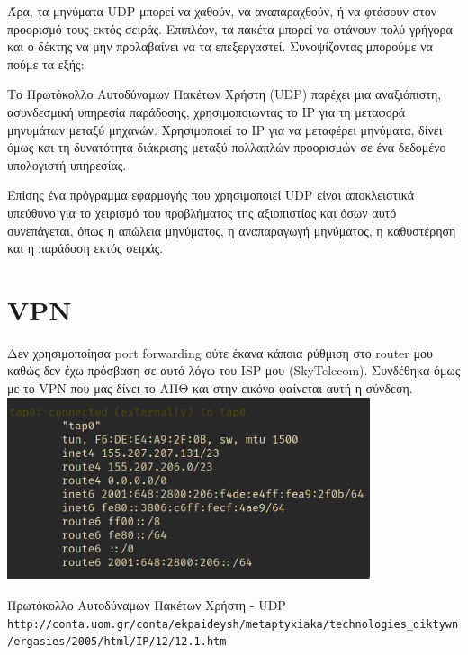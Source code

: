\documentclass{article}
\begin{document}
Άρα, τα μηνύματα UDP μπορεί να χαθούν, να αναπαραχθούν, ή να φτάσουν στον
προορισμό τους εκτός σειράς. Επιπλέον, τα πακέτα μπορεί να φτάνουν πολύ γρήγορα
και ο δέκτης να μην προλαβαίνει να τα επεξεργαστεί. Συνοψίζοντας μπορούμε να
πούμε τα εξής:

Το Πρωτόκολλο Αυτοδύναμων Πακέτων Χρήστη (UDP) παρέχει μια αναξιόπιστη,
ασυνδεσμική υπηρεσία παράδοσης, χρησιμοποιώντας το ΙΡ για τη μεταφορά μηνυμάτων
μεταξύ μηχανών. Χρησιμοποιεί το ΙΡ για να μεταφέρει μηνύματα, δίνει όμως και τη
δυνατότητα διάκρισης μεταξύ πολλαπλών προορισμών σε ένα δεδομένο υπολογιστή
υπηρεσίας.

Επίσης ένα πρόγραμμα εφαρμογής που χρησιμοποιεί UDP είναι αποκλειστικά υπεύθυνο για το
χειρισμό του προβλήματος της αξιοπιστίας και όσων αυτό συνεπάγεται, όπως η
απώλεια μηνύματος, η αναπαραγωγή μηνύματος, η καθυστέρηση και η παράδοση εκτός
σειράς.

\section{VPN}

Δεν χρησιμοποίησα port forwarding ούτε έκανα κάποια ρύθμιση στο router μου καθώς
δεν έχω πρόσβαση σε αυτό λόγω του ISP μου (SkyTelecom).
Συνδέθηκα όμως με το VPN που μας δίνει το ΑΠΘ και στην εικόνα φαίνεται αυτή η
σύνδεση.\\

\centering
\includegraphics[width=0.8\textwidth]{vpn}



\begin{thebibliography}{9}

Πρωτόκολλο Αυτοδύναμων Πακέτων Χρήστη - UDP
\\\texttt{http://conta.uom.gr/conta/ekpaideysh/metaptyxiaka/technologies\_diktywn
/ergasies/2005/html/IP/12/12.1.htm}
\end{thebibliography}
\end{document}
